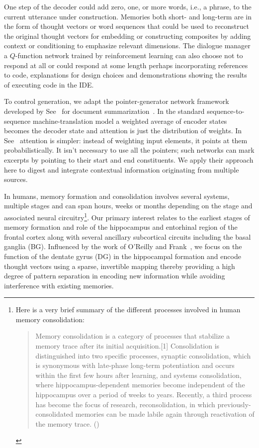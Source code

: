 One step of the decoder could add zero, one, or more words, i.e., a phrase, to the current utterance under construction. Memories \emdash{} both short- and long-term \emdash{} are in the form of thought vectors or word sequences that could be used to reconstruct the original thought vectors for embedding or constructing composites by adding context or conditioning to emphasize relevant dimensions. The dialogue manager \emdash{} a $Q$-function network trained by reinforcement learning \emdash{} can also choose not to respond at all or could respond at some length perhaps incorporating references to code, explanations for design choices and demonstrations showing the results of executing code in the IDE.

To control generation, we adapt the pointer-generator network framework developed by See~\etal{} for document summarization~\cite{SeeetalACL-17}. In the standard sequence-to-sequence machine-translation model a weighted average of encoder states becomes the decoder state and attention is just the distribution of weights. In See~\etal{} attention is simpler: instead of weighting input elements, it points at them probabilistically. It isn't necessary to use all the pointers; such networks can mark excerpts by pointing to their start and end constituents. We apply their approach here to digest and integrate contextual information originating from multiple sources.

In humans, memory formation and consolidation involves several systems, multiple stages and can span hours, weeks or months depending on the stage and associated neural circuitry\footnote{%
%
  Here is a very brief summary of the different processes involved in human memory consolidation:
%
\begin{quotation}
%
  Memory consolidation is a category of processes that stabilize a memory trace after its initial acquisition.[1] Consolidation is distinguished into two specific processes, synaptic consolidation, which is synonymous with late-phase long-term potentiation and occurs within the first few hours after learning, and systems consolidation, where hippocampus-dependent memories become independent of the hippocampus over a period of weeks to years. Recently, a third process has become the focus of research, reconsolidation, in which previously-consolidated memories can be made labile again through reactivation of the memory trace. ({})
%
\end{quotation}}.
%
Our primary interest relates to the earliest stages of memory formation and role of the hippocampus and entorhinal region of the frontal cortex along with several ancillary subcortical circuits including the basal ganglia (BG). Influenced by the work of O'Reilly and Frank{}~\cite{OReillyandFrankNC-06}, we focus on the function of the dentate gyrus (DG) in the hippocampal formation and encode thought vectors using a sparse, invertible mapping thereby providing a high degree of pattern separation in encoding new information while avoiding interference with existing memories. 

